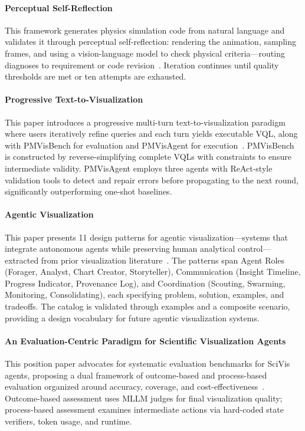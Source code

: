 \paragraph{Perceptual Self-Reflection}
This framework generates physics simulation code from natural language and validates it through perceptual self-reflection: rendering the animation, sampling frames, and using a vision-language model to check physical criteria—routing diagnoses to requirement or code revision~\cite{avg260212311}. Iteration continues until quality thresholds are met or ten attempts are exhausted. 

\paragraph{Progressive Text-to-Visualization}
This paper introduces a progressive multi-turn text-to-visualization paradigm where users iteratively refine queries and each turn yields executable VQL, along with PMVisBench for evaluation and PMVisAgent for execution~\cite{avg260529692}. PMVisBench is constructed by reverse-simplifying complete VQLs with constraints to ensure intermediate validity. PMVisAgent employs three agents with ReAct-style validation tools to detect and repair errors before propagating to the next round, significantly outperforming one-shot baselines.

\paragraph{Agentic Visualization}
This paper presents 11 design patterns for agentic visualization—systems that integrate autonomous agents while preserving human analytical control—extracted from prior visualization literature~\cite{avg250519101}. The patterns span Agent Roles (Forager, Analyst, Chart Creator, Storyteller), Communication (Insight Timeline, Progress Indicator, Provenance Log), and Coordination (Scouting, Swarming, Monitoring, Consolidating), each specifying problem, solution, examples, and tradeoffs. The catalog is validated through examples and a composite scenario, providing a design vocabulary for future agentic visualization systems.

\paragraph{An Evaluation-Centric Paradigm for Scientific Visualization Agents}
This position paper advocates for systematic evaluation benchmarks for SciVis agents, proposing a dual framework of outcome-based and process-based evaluation organized around accuracy, coverage, and cost-effectiveness~\cite{avg250915160}. Outcome-based assessment uses MLLM judges for final visualization quality; process-based assessment examines intermediate actions via hard-coded state verifiers, token usage, and runtime. 

